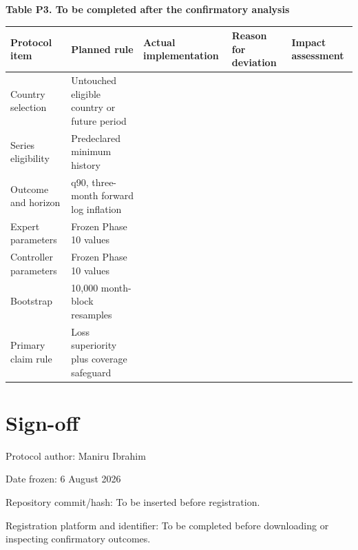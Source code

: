 \documentclass[11pt,a4paper]{article}
\begin{document}
\textbf{Table P3. To be completed after the confirmatory analysis}

\begin{longtable}[]{@{}p{}p{}p{}p{}p{}@{}}
\toprule
\textbf{Protocol item} & \textbf{Planned rule} & \textbf{Actual implementation} & \textbf{Reason for deviation} & \textbf{Impact assessment} \\
\midrule
\endhead
\bottomrule
\endlastfoot
Country selection & Untouched eligible country or future period & & & \\
Series eligibility & Predeclared minimum history & & & \\
Outcome and horizon & q90, three-month forward log inflation & & & \\
Expert parameters & Frozen Phase 10 values & & & \\
Controller parameters & Frozen Phase 10 values & & & \\
Bootstrap & 10,000 month-block resamples & & & \\
Primary claim rule & Loss superiority plus coverage safeguard & & & \\
\end{longtable}

\section{Sign-off}\label{sign-off}

Protocol author: Maniru Ibrahim

Date frozen: 6 August 2026

Repository commit/hash: To be inserted before registration.

Registration platform and identifier: To be completed before downloading
or inspecting confirmatory outcomes.
\end{document}
